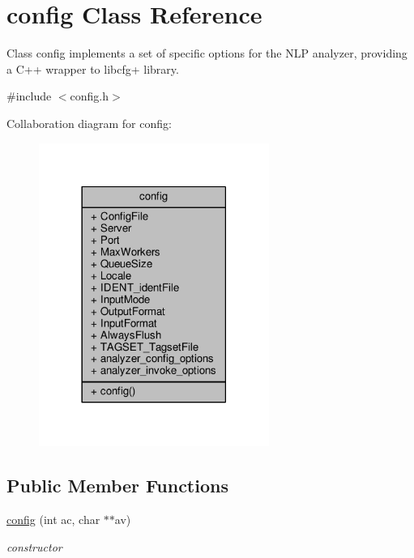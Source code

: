 \hypertarget{classconfig}{}\section{config Class Reference}
\label{classconfig}


Class config implements a set of specific options for the N\+L\+P analyzer, providing a C++ wrapper to libcfg+ library.  




{\ttfamily \#include $<$config.\+h$>$}



Collaboration diagram for config\+:
\nopagebreak
\begin{figure}[H]
\begin{center}
\leavevmode
\includegraphics[width=213pt]{classconfig__coll__graph}
\end{center}
\end{figure}
\subsection*{Public Member Functions}
\begin{DoxyCompactItemize}
\item 
\hyperlink{classconfig_afe4a0fda7bf097bd04d713c06797e1f1}{config} (int ac, char $\ast$$\ast$av)
\begin{DoxyCompactList}\small\item\em constructor \end{DoxyCompactList}\end{DoxyCompactItemize}

